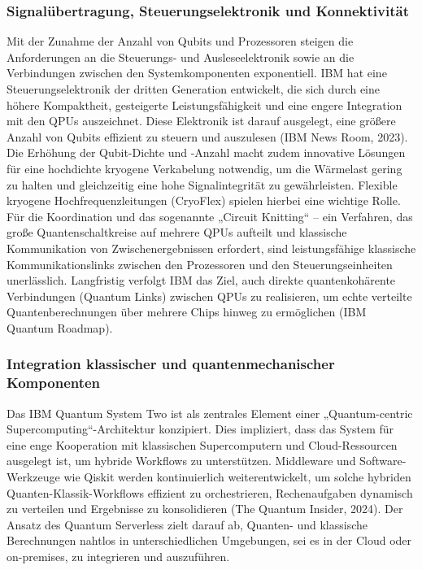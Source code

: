 


\subsubsection{Signalübertragung, Steuerungselektronik und Konnektivität}
Mit der Zunahme der Anzahl von Qubits und Prozessoren steigen die Anforderungen an die Steuerungs- und Ausleseelektronik sowie an die Verbindungen zwischen den Systemkomponenten exponentiell. %
IBM hat eine Steuerungselektronik der dritten Generation entwickelt, die sich durch eine höhere Kompaktheit, gesteigerte Leistungsfähigkeit und eine engere Integration mit den QPUs auszeichnet. Diese Elektronik ist darauf ausgelegt, eine größere Anzahl von Qubits effizient zu steuern und auszulesen (IBM News Room, 2023). %
Die Erhöhung der Qubit-Dichte und -Anzahl macht zudem innovative Lösungen für eine hochdichte kryogene Verkabelung notwendig, um die Wärmelast gering zu halten und gleichzeitig eine hohe Signalintegrität zu gewährleisten. Flexible kryogene Hochfrequenzleitungen (CryoFlex) spielen hierbei eine wichtige Rolle. Für die Koordination und das sogenannte „Circuit Knitting“ – ein Verfahren, das große Quantenschaltkreise auf mehrere QPUs aufteilt und klassische Kommunikation von Zwischenergebnissen erfordert, sind leistungsfähige klassische Kommunikationslinks zwischen den Prozessoren und den Steuerungseinheiten unerlässlich. %
Langfristig verfolgt IBM das Ziel, auch direkte quantenkohärente Verbindungen (Quantum Links) zwischen QPUs zu realisieren, um echte verteilte Quantenberechnungen über mehrere Chips hinweg zu ermöglichen (IBM Quantum Roadmap).

\subsubsection{Integration klassischer und quantenmechanischer Komponenten}
Das IBM Quantum System Two ist als zentrales Element einer „Quantum-centric Supercomputing“-Architektur konzipiert. Dies impliziert, dass das System für eine enge Kooperation mit klassischen Supercomputern und Cloud-Ressourcen ausgelegt ist, um hybride Workflows zu unterstützen. Middleware und Software-Werkzeuge wie Qiskit werden kontinuierlich weiterentwickelt, um solche hybriden Quanten-Klassik-Workflows effizient zu orchestrieren, Rechenaufgaben dynamisch zu verteilen und Ergebnisse zu konsolidieren (The Quantum Insider, 2024). %
Der Ansatz des Quantum Serverless zielt darauf ab, Quanten- und klassische Berechnungen nahtlos in unterschiedlichen Umgebungen, sei es in der Cloud oder on-premises, zu integrieren und auszuführen.

